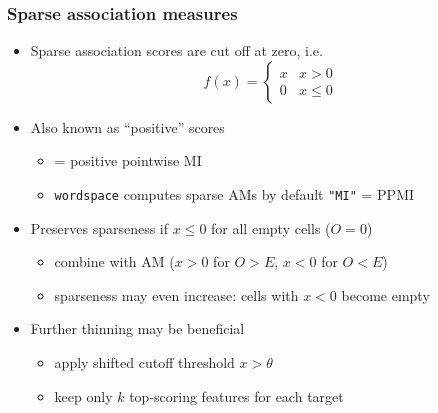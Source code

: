 \documentclass[t]{beamer} %
\begin{document}
\begin{frame}
  \frametitle{Sparse association measures}

  \begin{itemize}
  \item Sparse association scores are cut off at zero, i.e.\
    \[
    f(x) =
    \begin{cases}
      x & x > 0 \\
      0 & x \leq 0
    \end{cases}
    \]
  \item Also known as ``positive'' scores
    \begin{itemize}
    \item {} = positive pointwise MI \citep[e.g.][]{Bullinaria:Levy:07}
    \item \texttt{wordspace} computes sparse AMs by default \so \texttt{"MI"} = PPMI
    \end{itemize}
  \item<2-> Preserves sparseness if $x \leq 0$ for all empty cells ($O = 0$)
    \begin{itemize}
    \item combine with  AM ($x > 0$ for $O > E$, $x < 0$ for $O < E$)
    \item sparseness may even increase: cells with $x < 0$ become empty
    \end{itemize}
  \item<3-> Further thinning may be beneficial \citep{Polajnar:Clark:14}
    \begin{itemize}
    \item apply shifted cutoff threshold $x > \theta$ \citep{Levy:Goldberg:Dagan:15}
    \item keep only $k$ top-scoring features for each target
    \end{itemize}
  \end{itemize}
\end{frame}
\end{document}
